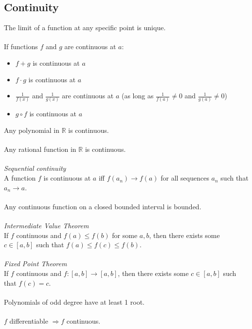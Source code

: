 \documentclass{scrartcl}
\newcommand{\R}{\mathbb{R}}
\begin{document}
\subsection{Continuity}
The limit of a function at any specific point is unique.
\\\\
If functions $ f $ and $ g $ are continuous at $ a $:
\begin{itemize}
\item $ f + g $ is continuous at $ a $
\item $ f \cdot g $ is continuous at $ a $
\item $ \frac{1}{f(x)} $ and $ \frac{1}{g(x)} $ are continuous at $ a $ \quad (as long as $ \frac{1}{f(a)} \neq 0 $ and $ \frac{1}{g(a)} \neq 0 $)
\item $ g \circ f $ is continuous at $ a $
\end{itemize}
Any polynomial in $ \R $ is continuous.
\\\\
Any rational function in $ \R $ is continuous.
\\\\
\textit{Sequential continuity}
\\
A function $ f $ is continuous at $ a $ iff $ f(a_{n}) \to f(a) $ for all sequences $ a_{n} $ such that $ a_{n} \to a $.
\\\\
Any continuous function on a closed bounded interval is bounded.
\\\\
\textit{Intermediate Value Theorem}
\\
If $ f $ continuous and $ f(a) \leq f(b) $ for some $ a, b $, then there exists some $ c \in [a, b] $ such that $ f(a) \leq f(c) \leq f(b) $.
\\\\
\textit{Fixed Point Theorem}
\\
If $ f $ continuous and $ f: [a, b] \to [a, b] $, then there exists some $ c \in [a, b] $ such that $ f(c) = c $.
\\\\
Polynomials of odd degree have at least 1 root.
\\\\
$ f $ differentiable $ \Rightarrow f $ continuous.
\end{document}

